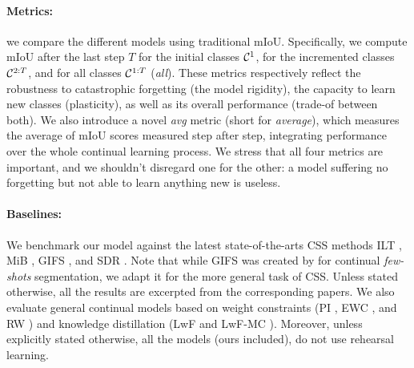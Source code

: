\paragraph{Metrics:} we compare the different models using traditional \acf{mIoU}.
Specifically, we compute \ac{mIoU} after the last step $T$ for the initial classes $\mathcal{C}^{1}$, for
the incremented classes $\mathcal{C}^{2:T}$, and for all classes $\mathcal{C}^{1:T}$ (\textit{all}). These metrics
respectively reflect the robustness to catastrophic forgetting (the model rigidity), the capacity to
learn new classes (plasticity), as well as its overall performance (trade-of between both). We also
introduce a novel \textit{avg} metric (short for \textit{average}), which measures the average of
\ac{mIoU} scores measured step after step, integrating performance over the whole continual learning
process. We stress that all four metrics are important, and we shouldn't disregard one for the other:
a model suffering no forgetting but not able to learn anything new is useless.



\paragraph{Baselines:} We benchmark our model against the latest state-of-the-arts \ac{CSS}
methods ILT \citep{michieli2019ilt}, MiB \citep{cermelli2020modelingthebackground}, GIFS
\citep{cermelli2020fewshotcontinualsegm}, and SDR \citep{michieli2021sdr}. Note that while GIFS was
created by \cite{cermelli2020fewshotcontinualsegm} for continual \textit{few-shots}
segmentation, we adapt it for the more general task of \ac{CSS}. Unless stated otherwise, all the results
are excerpted from the corresponding papers. We also evaluate general continual models based on
weight constraints (PI \citep{zenke2017synaptic_intelligence}, EWC \citep{kirkpatrick2017ewc}, and RW
\citep{chaudhry2018riemannien_walk}) and knowledge distillation (LwF \citep{li2018lwf} and LwF-MC
\citep{rebuffi2017icarl}). Moreover, unless explicitly stated otherwise, all the models (ours
included), do not use rehearsal learning.


